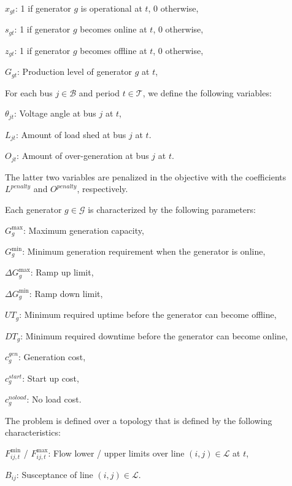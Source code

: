 \begin{description} \setlength{\itemsep}{-1pt}
\item{$x_{gt}$:} 1 if generator $g$ is operational at $t$, 0 otherwise,
\item{$s_{gt}$:} 1 if generator $g$ becomes online at $t$, 0 otherwise,
\item{$z_{gt}$:} 1 if generator $g$ becomes offline at $t$, 0 otherwise,
\item{$G_{gt}$:} Production level of generator $g$ at $t$, 
\end{description}

For each bus $j\in \mathcal{B}$ and period $t \in \mathcal{T}$, we define the following variables: 
\begin{description}
\item{$\theta_{jt}$:} Voltage angle at bus $j$ at $t$,
\item{$L_{jt}$:} Amount of load shed at bus $j $ at $t$.
\item{$O_{jt}$:} Amount of over-generation at bus $j$ at $t$.
\end{description}
The latter two variables are penalized in the objective with the coefficients $L^{penalty}$ and $O^{penalty}$, respectively. 

Each generator $g \in \mathcal{G}$ is characterized by the following parameters:
\begin{description} \setlength{\itemsep}{-1pt}
\item{$G_g^{\max}$:} Maximum generation capacity, 
\item{$G_g^{\min}$: } Minimum generation requirement when the generator is online, 
\item{$\Delta G_g^{\max}$: } Ramp up limit, 
\item{$\Delta G_g^{\min}$:} Ramp down limit,
\item{$UT_g$:} Minimum required uptime before the generator can become offline, 
\item{$DT_g$:} Minimum required downtime before the generator can become online,
\item{$c_g^{gen}$:} Generation cost,
\item{$c_g^{start}$:} Start up cost,
\item{$c_g^{noload}$:} No load cost.
\end{description}

The problem is defined over a topology that is defined by the following characteristics:
\begin{description} \setlength{\itemsep}{-1pt}
\item{$F^{\min}_{ij,t}$ / $F^{\max}_{ij,t}$:} Flow lower / upper limits over line $(i,j) \in \mathcal{L}$ at $t$,
\item{$B_{ij}$:} Susceptance of line $(i,j) \in \mathcal{L}$.
\end{description}

